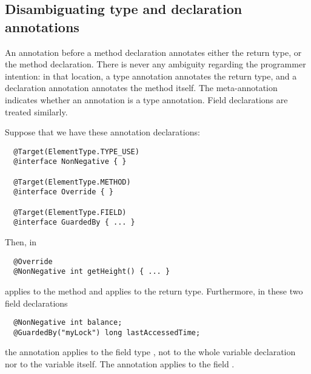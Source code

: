 \documentclass[10pt]{article}
\begin{document}





\subsection{Disambiguating type and declaration annotations\label{disambiguating}}

An annotation before a method declaration annotates either the return type,
or the method declaration.  There is never any ambiguity regarding the
programmer intention:  in that location, a type annotation annotates the
return type, and a declaration annotation annotates the method itself.  The
 meta-annotation indicates whether an annotation is a type
annotation.  Field declarations are treated similarly.



Suppose that we have these annotation declarations:
\begin{Verbatim}
  @Target(ElementType.TYPE_USE)
  @interface NonNegative { }

  @Target(ElementType.METHOD)
  @interface Override { }

  @Target(ElementType.FIELD)
  @interface GuardedBy { ... }
\end{Verbatim}
Then, in
\begin{Verbatim}
  @Override
  @NonNegative int getHeight() { ... }
\end{Verbatim}
 applies to the method and  applies
to the return type.
Furthermore, in these two field declarations
\begin{Verbatim}
  @NonNegative int balance;
  @GuardedBy("myLock") long lastAccessedTime;
\end{Verbatim}
the annotation  applies to the field type ,
not to the whole variable declaration nor to the variable 
itself.  The annotation  applies to the
field .
\end{document}
